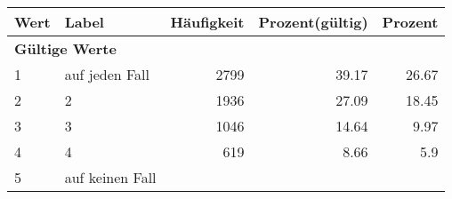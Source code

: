      \begin{longtable}{lXrrr}
     \toprule
     \textbf{Wert} & \textbf{Label} & \textbf{Häufigkeit} & \textbf{Prozent(gültig)} & \textbf{Prozent} \\
     \endhead
     \midrule
     \multicolumn{5}{l}{\textbf{Gültige Werte}}\\

     1 &
     \multicolumn{1}{X}{ auf jeden Fall   } &


       \num{2799} &
       \num[round-mode=places,round-precision=2]{39.17} &
         \num[round-mode=places,round-precision=2]{26.67} \\

     2 &
     \multicolumn{1}{X}{ 2   } &


       \num{1936} &
       \num[round-mode=places,round-precision=2]{27.09} &
         \num[round-mode=places,round-precision=2]{18.45} \\

     3 &
     \multicolumn{1}{X}{ 3   } &


       \num{1046} &
       \num[round-mode=places,round-precision=2]{14.64} &
         \num[round-mode=places,round-precision=2]{9.97} \\

     4 &
     \multicolumn{1}{X}{ 4   } &


       \num{619} &
       \num[round-mode=places,round-precision=2]{8.66} &
         \num[round-mode=places,round-precision=2]{5.9} \\

     5 &
     \multicolumn{1}{X}{ auf keinen Fall   } &



\end{longtable}

